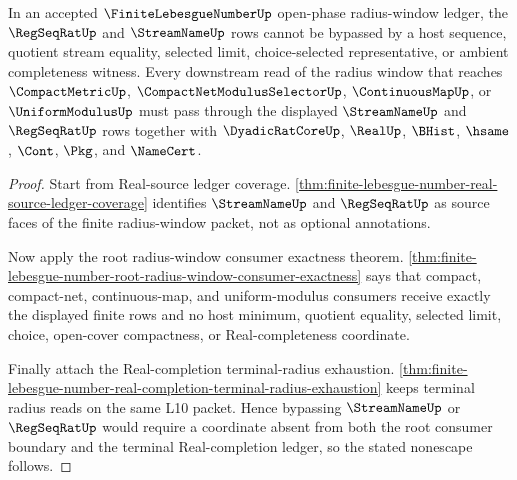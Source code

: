 \begin{theorem}
\label{thm:finite-lebesgue-number-regseq-streamname-nonescape}
In an accepted $\FiniteLebesgueNumberUp$ open-phase radius-window ledger, the $\RegSeqRatUp$ and $\StreamNameUp$ rows cannot be bypassed by a host sequence, quotient stream equality, selected limit, choice-selected representative, or ambient completeness witness. Every downstream read of the radius window that reaches $\CompactMetricUp$, $\CompactNetModulusSelectorUp$, $\ContinuousMapUp$, or $\UniformModulusUp$ must pass through the displayed $\StreamNameUp$ and $\RegSeqRatUp$ rows together with $\DyadicRatCoreUp$, $\RealUp$, $\BHist$, $\hsame$, $\Cont$, $\Pkg$, and $\NameCert$.
\end{theorem}
\begin{proof}
Start from Real-source ledger coverage. \autoref{thm:finite-lebesgue-number-real-source-ledger-coverage} identifies $\StreamNameUp$ and $\RegSeqRatUp$ as source faces of the finite radius-window packet, not as optional annotations.

Now apply the root radius-window consumer exactness theorem. \autoref{thm:finite-lebesgue-number-root-radius-window-consumer-exactness} says that compact, compact-net, continuous-map, and uniform-modulus consumers receive exactly the displayed finite rows and no host minimum, quotient equality, selected limit, choice, open-cover compactness, or Real-completeness coordinate.

Finally attach the Real-completion terminal-radius exhaustion. \autoref{thm:finite-lebesgue-number-real-completion-terminal-radius-exhaustion} keeps terminal radius reads on the same L10 packet. Hence bypassing $\StreamNameUp$ or $\RegSeqRatUp$ would require a coordinate absent from both the root consumer boundary and the terminal Real-completion ledger, so the stated nonescape follows.
\end{proof}

